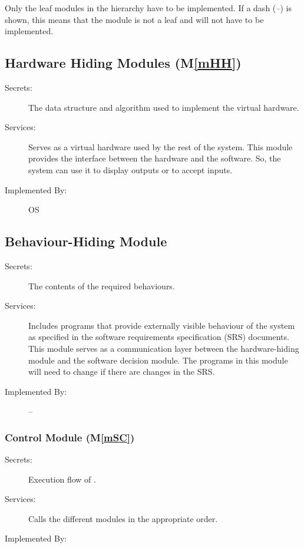 \documentclass[12pt, titlepage]{article}
\newcommand{\mref}[1]{M\ref{#1}}
\begin{document}
	Only the leaf modules in the hierarchy have to be implemented. If a dash
	(\emph{--}) is shown, this means that the module is not a leaf and will not have
	to be implemented.
	
	\subsection{Hardware Hiding Modules (\mref{mHH})}
	
	\begin{description} \item[Secrets:]The data structure and algorithm used to
		implement the virtual hardware. \item[Services:]Serves as a virtual hardware
		used by the rest of the system. This module provides the interface between the
		hardware and the software. So, the system can use it to display outputs or to
		accept inputs. \item[Implemented By:] OS \end{description}
	
	\subsection{Behaviour-Hiding Module}
	
	\begin{description} \item[Secrets:]The contents of the required behaviours.
		\item[Services:]Includes programs that provide externally visible behaviour of
		the system as specified in the software requirements specification (SRS)
		documents. This module serves as a communication layer between the
		hardware-hiding module and the software decision module. The programs in this
		module will need to change if there are changes in the SRS. \item[Implemented
		By:] -- \end{description}
	
	\subsubsection{\progname{} Control Module (\mref{mSC})}
	
	\begin{description} \item[Secrets:]Execution flow of \progname{}.
		\item[Services:]Calls the different modules in the appropriate order.
		\item[Implemented By:] \progname{} \end{description}
	
\end{document}

